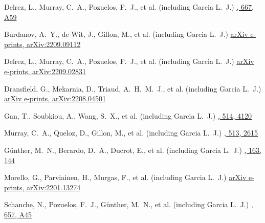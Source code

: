 {Delrez, L., Murray, C.~A., Pozuelos, F.~J., et al. (including Garcia L.~J.)}
{\href{https://ui.adsabs.harvard.edu/abs/2022A\&A...667A..59D}{\aap, 667, A59}}

{Burdanov, A.~Y., de Wit, J., Gillon, M., et al. (including Garcia L.~J.)}
{\href{https://ui.adsabs.harvard.edu/abs/2022arXiv220909112B}{arXiv e-prints, arXiv:2209.09112}}

{Delrez, L., Murray, C.~A., Pozuelos, F.~J., et al. (including Garcia L.~J.)}
{\href{https://ui.adsabs.harvard.edu/abs/2022arXiv220902831D}{arXiv e-prints, arXiv:2209.02831}}

{Dransfield, G., Mekarnia, D., Triaud, A.~H.~M.~J., et al. (including Garcia L.~J.)}
{\href{https://ui.adsabs.harvard.edu/abs/2022arXiv220804501D}{arXiv e-prints, arXiv:2208.04501}}

{Gan, T., Soubkiou, A., Wang, S.~X., et al. (including Garcia L.~J.)}
{\href{https://ui.adsabs.harvard.edu/abs/2022MNRAS.514.4120G}{\mnras, 514, 4120}}

{Murray, C.~A., Queloz, D., Gillon, M., et al. (including Garcia L.~J.)}
{\href{https://ui.adsabs.harvard.edu/abs/2022MNRAS.513.2615M}{\mnras, 513, 2615}}

{G{\"u}nther, M.~N., Berardo, D.~A., Ducrot, E., et al. (including Garcia L.~J.)}
{\href{https://ui.adsabs.harvard.edu/abs/2022AJ....163..144G}{\aj, 163, 144}}

{Morello, G., Parviainen, H., Murgas, F., et al. (including Garcia L.~J.)}
{\href{https://ui.adsabs.harvard.edu/abs/2022arXiv220113274M}{arXiv e-prints, arXiv:2201.13274}}

{Schanche, N., Pozuelos, F.~J., G{\"u}nther, M.~N., et al. (including Garcia L.~J.)}
{\href{https://ui.adsabs.harvard.edu/abs/2022A\&A...657A..45S}{\aap, 657, A45}}

